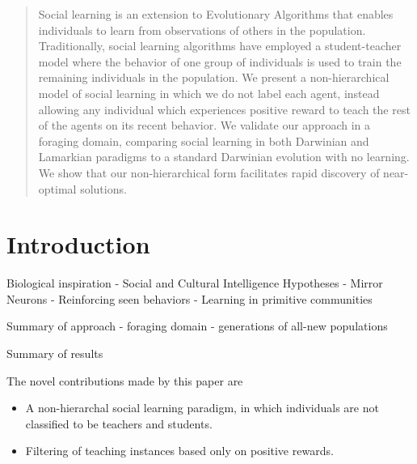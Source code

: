 \documentclass{acm_proc_article-sp}
\begin{document}
\maketitle
\begin{abstract}
Social learning is an extension to Evolutionary Algorithms that enables individuals to learn from observations of others in the population.
 Traditionally, social learning algorithms have employed a student-teacher model where the behavior of one group of individuals is used to train the remaining individuals in the population.  
 We present a non-hierarchical model of social learning in which we do not label each agent, instead allowing any individual which experiences positive reward to teach the rest of the agents on its recent behavior. 
 We validate our approach in a foraging domain, comparing social learning in both Darwinian and Lamarkian paradigms to a standard Darwinian evolution with no learning. 
 We show that our non-hierarchical form facilitates rapid discovery of near-optimal solutions.
\end{abstract}



\section{Introduction}
Biological inspiration
    - Social and Cultural Intelligence Hypotheses
    - Mirror Neurons
        - Reinforcing seen behaviors
    - Learning in primitive communities
    
Summary of approach
    - foraging domain
    - generations of all-new populations
    
Summary of results

The novel contributions made by this paper are 
\begin{itemize}
\item A non-hierarchal social learning paradigm, in which individuals are not classified to be teachers and students.
\item Filtering of teaching instances based only on positive rewards. 
\end{itemize}
    
\end{document}
